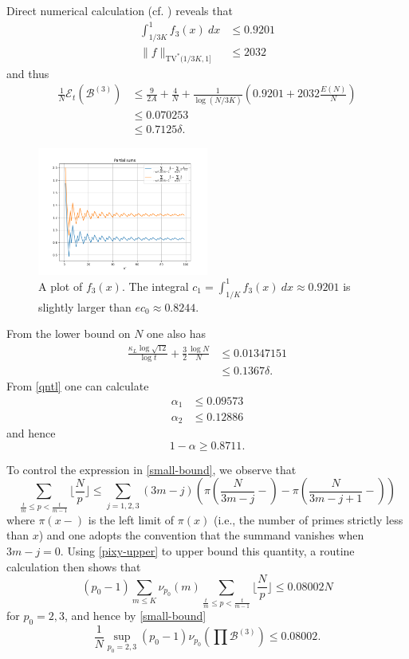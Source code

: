 \documentclass[12pt,a4paper,reqno]{amsart}
\numberwithin{equation}{section}
\theoremstyle{plain}
\theoremstyle{definition}
\newcommand\tuple{{\mathcal B}}
\newcommand\excess{{\mathcal{E}}}
\begin{document}
Direct numerical calculation (cf. ) reveals that
\begin{align*}
  \int_{1/3K}^1 f_3(x)\ dx &\leq 0.9201  \\
  \|f\|_{\mathrm{TV}^*(1/3K,1]} &\leq 2032
\end{align*}
and thus
\begin{align*}
  \frac{1}{N}\excess_t(\tuple^{(3)}) &\leq \frac{9}{2A} + \frac{4}{N} + \frac{1}{\log(N/3K)} \left(0.9201 + 2032 \frac{E(N)}{N}\right) \\
  &\leq 0.070253 \\
  &\leq 0.7125 \delta.
\end{align*}
\begin{figure}
  \centering
  \includegraphics[width=0.5\textwidth]{discrepancy.png}
  \caption{A plot of $f_3(x)$.  The integral $c_1 = \int_{1/K}^1 f_3(x)\ dx \approx 0.9201$ is slightly larger than $ec_0 \approx 0.8244$.}
  \label{fig-f}
  \end{figure}
From the lower bound on $N$ one also has
\begin{align*}
  \frac{\kappa_L \log \sqrt{12}}{\log t} + \frac{3}{2} \frac{\log N}{N} &\leq 0.01347151 \\
  &\leq 0.1367 \delta.
\end{align*}
From \eqref{qntl} one can calculate
\begin{align*}
  \alpha_1 &\leq 0.09573 \\
  \alpha_2 &\leq 0.12886
\end{align*}
and hence
$$ 1-\alpha \geq 0.8711.$$

To control the expression in \eqref{small-bound}, we observe that
\begin{equation}\label{tm}
   \sum_{\frac{t}{m} \leq p < \frac{t}{m-1}} \lfloor \frac{N}{p} \rfloor \leq \sum_{j=1,2,3} (3m-j) \left(\pi\left(\frac{N}{3m-j}-\right) - \pi\left(\frac{N}{3m-j+1}-\right)\right)
\end{equation}
where $\pi(x-)$ is the left limit of $\pi(x)$ (i.e., the number of primes strictly less than $x$) and one adopts the convention that the summand vanishes when $3m-j=0$.  Using \eqref{pixy-upper} to upper bound this quantity, a routine calculation then shows that
$$ (p_0-1) \sum_{m \leq K} \nu_{p_0}(m) \sum_{\frac{t}{m} \leq p < \frac{t}{m-1}} \lfloor \frac{N}{p} \rfloor \leq 0.08002N$$
for $p_0=2,3$,
and hence by \eqref{small-bound}
$$ \frac{1}{N} \sup_{p_0=2,3} (p_0-1) \nu_{p_0}\left( \prod \tuple^{(3)}\right) \leq 0.08002.$$
\end{document}
